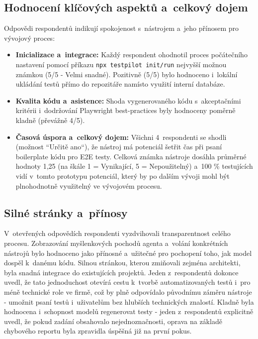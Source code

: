 \documentclass[czech, ing, kiv, he, iso690numb, viewonly]{fasthesis}
\begin{document}
\subsection*{Hodnocení klíčových aspektů a~celkový dojem}
Odpovědi respondentů indikují spokojenost s~nástrojem a~jeho přínosem pro vývojový proces:

\begin{itemize}
    \item \textbf{Inicializace a~integrace:} Každý respondent ohodnotil proces 
    počátečního nastavení pomocí příkazu \texttt{npx testpilot init/run} nejvyšší možnou známkou 
    (5/5 - Velmi snadné). Pozitivně (5/5) bylo hodnoceno i~lokální ukládání testů přímo do 
    repozitáře namísto využití interní databáze.
    \item \textbf{Kvalita kódu a~asistence:} Shoda vygenerovaného kódu s~akceptačními kritérii i~dodržování Playwright best-practices byly hodnoceny poměrně kladně (převážně 4/5). 
    \item \textbf{Časová úspora a~celkový dojem:} Všichni 4~respondenti se shodli (možnost ``Určitě ano``), 
    že nástroj má potenciál šetřit čas při psaní boilerplate kódu pro E2E testy. Celková známka nástroje dosáhla 
    průměrné hodnoty 1,25 (na škále 1 = Vynikající, 5 = Nepoužitelný) a~100 \% testujících vidí v~tomto prototypu potenciál, který by po dalším vývoji mohl být plnohodnotně využitelný ve vývojovém procesu.
\end{itemize}

\subsection*{Silné stránky a~přínosy}
V~otevřených odpovědích respondenti vyzdvihovali 
transparentnost celého procesu. Zobrazování myšlenkových pochodů agenta a~volání konkrétních
nástrojů bylo hodnoceno jako přínosné a~užitečné pro pochopení toho, jak model dospěl k~danému kódu.
Silnou stránkou, kterou zmiňovali zejména architekti, byla snadná integrace do existujících projektů.
Jeden z~respondentů dokonce uvedl, že tato jednoduchost otevírá cestu k~tvorbě automatizovaných testů 
i~pro méně technické role ve firmě, což by plně odpovídalo původnímu záměru nástroje - 
umožnit psaní testů i~uživatelům bez hlubších technických znalostí.
Kladně byla hodnocena i~schopnost modelů regenerovat testy - 
jeden z~respondentů explicitně uvedl, že pokud zadání obsahovalo nejednoznačnosti, 
oprava na základě chybového reportu byla zpravidla úspěšná již na první pokus.
\end{document}
